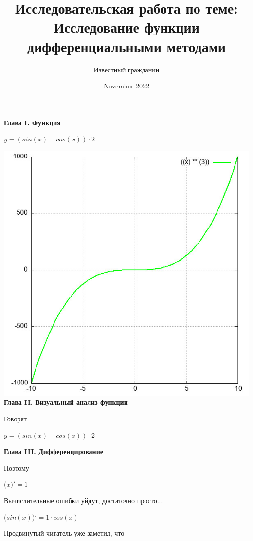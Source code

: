 \documentclass[12pt,a4paper,fleqn]{article}
\title{\textbf{\LARGE{Исследовательская работа по теме:\\Исследование функции дифференциальными методами}}}
\author{Известный гражданин}
\date{November 2022}
\begin{document}
\maketitle
\newpage\newpage \textbf{\LARGE{Глава I. Функция}}

\begin{center}
$y = $$(sin(x)+cos(x)) \cdot 2$

\end{center}
\includegraphics{GraphicDumps/plot.jpg}\newpage \textbf{\LARGE{Глава II. Визуальный анализ функции}}

Говорят

\begin{center}
$y = $$(sin(x)+cos(x)) \cdot 2$

\end{center}
\newpage \textbf{\LARGE{Глава III. Дифференцирование}}

Поэтому

\begin{center}
 ($x)'
  = 1$\end{center}
Вычислительные ошибки уйдут, достаточно просто...

\begin{center}
 ($sin(x))'
  = 1 \cdot cos(x)$\end{center}
Продвинутый читатель уже заметил, что
\end{document}

